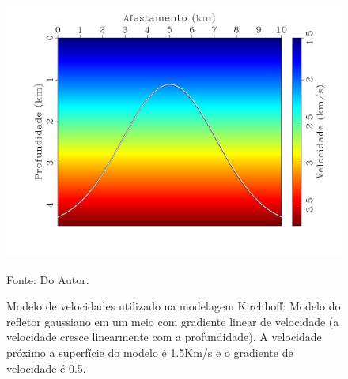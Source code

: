 \begin{figure}[H]
\caption{Modelo de velocidades utilizado na modelagem Kirchhoff: Modelo do refletor gaussiano em um meio com
gradiente linear de velocidade (a velocidade cresce linearmente com a profundidade). A velocidade próximo 
a superfície do modelo é 1.5Km/s e o gradiente de velocidade é 0.5.}
\begin{center}
\includegraphics[scale=0.3]{images/dome.jpeg}
\vspace{-0.3cm}
\end{center}
\begin{center}
 Fonte: Do Autor.
\end{center}
\label{fig:5.1}
\end{figure}

